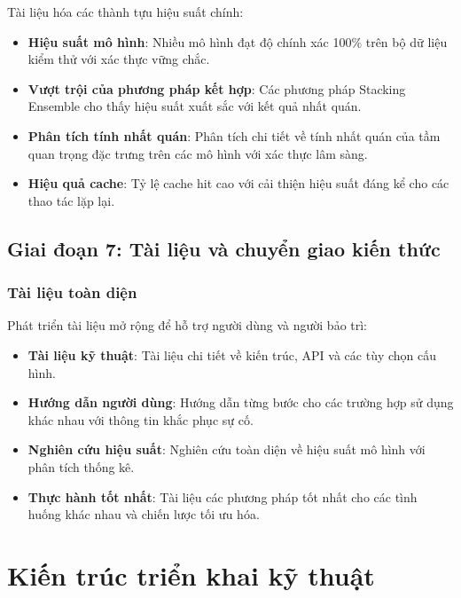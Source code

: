 Tài liệu hóa các thành tựu hiệu suất chính:

\begin{itemize}
    \item \textbf{Hiệu suất mô hình}: Nhiều mô hình đạt độ chính xác 100\% trên bộ dữ liệu kiểm thử với xác thực vững chắc.
    \item \textbf{Vượt trội của phương pháp kết hợp}: Các phương pháp Stacking Ensemble cho thấy hiệu suất xuất sắc với kết quả nhất quán.
    \item \textbf{Phân tích tính nhất quán}: Phân tích chi tiết về tính nhất quán của tầm quan trọng đặc trưng trên các mô hình với xác thực lâm sàng.
    \item \textbf{Hiệu quả cache}: Tỷ lệ cache hit cao với cải thiện hiệu suất đáng kể cho các thao tác lặp lại.
\end{itemize}

\subsection{Giai đoạn 7: Tài liệu và chuyển giao kiến thức}\label{subsec:documentation-stage}

\subsubsection{Tài liệu toàn diện}

Phát triển tài liệu mở rộng để hỗ trợ người dùng và người bảo trì:

\begin{itemize}
    \item \textbf{Tài liệu kỹ thuật}: Tài liệu chi tiết về kiến trúc, API và các tùy chọn cấu hình.
    \item \textbf{Hướng dẫn người dùng}: Hướng dẫn từng bước cho các trường hợp sử dụng khác nhau với thông tin khắc phục sự cố.
    \item \textbf{Nghiên cứu hiệu suất}: Nghiên cứu toàn diện về hiệu suất mô hình với phân tích thống kê.
    \item \textbf{Thực hành tốt nhất}: Tài liệu các phương pháp tốt nhất cho các tình huống khác nhau và chiến lược tối ưu hóa.
\end{itemize}

\section{Kiến trúc triển khai kỹ thuật}\label{sec:technical-architecture}

